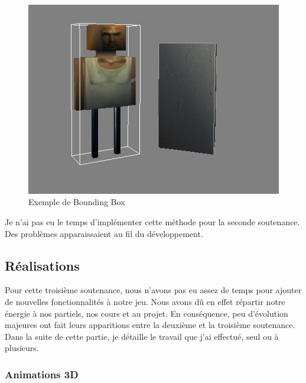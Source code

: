 \documentclass[12pt]{article}
\begin{document}
\begin{figure}[h]
\begin{center}
\includegraphics[scale=0.5]{BoundingBox.jpg}
\caption{Exemple de Bounding Box}
\end{center}
\end{figure}

Je n'ai pas eu le temps d'implémenter cette méthode pour la seconde soutenance. Des problèmes apparaissaient au fil du développement.



\subsection{Réalisations}

Pour cette troisième soutenance, nous n'avons pas eu assez de temps pour ajouter de nouvelles fonctionnalités à notre jeu. Nous avons dû en effet répartir notre énergie à nos partiels, nos cours et au projet. En conséquence, peu d'évolution majeures ont fait leurs apparitions entre la deuxième et la troisième soutenance. Dans la suite de cette partie, je détaille le travail que j'ai effectué, seul ou à plusieurs.

\subsubsection{Animations 3D}
\end{document}
